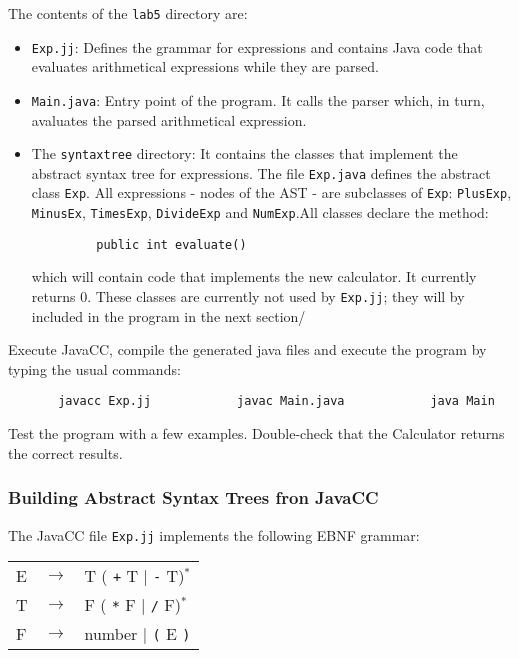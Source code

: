 \documentclass{article}
\begin{document}
The contents of the {\tt lab5} directory are:
\begin{itemize}
\item {\tt Exp.jj}: Defines the grammar for expressions and contains Java code that evaluates arithmetical expressions while they are parsed.
\item {\tt Main.java}: Entry point of the program. It calls the parser which, in turn, avaluates the parsed arithmetical expression.
\item The {\tt syntaxtree} directory: It contains the classes that implement the abstract syntax tree for expressions. The file {\tt Exp.java} defines the abstract class {\tt Exp}. All expressions - nodes of the AST - are subclasses of {\tt Exp}: {\tt PlusExp}, {\tt MinusEx}, {\tt TimesExp}, {\tt DivideExp} and {\tt NumExp}.All classes declare the method:
\begin{verbatim}
         public int evaluate()
\end{verbatim}
which will contain code that implements the new calculator. It currently returns 0. These classes are currently not used by \verb+Exp.jj+; they will by included in the program in the next section/

\end{itemize}

Execute JavaCC, compile the generated java files and execute the program by typing the usual commands:

\begin{verbatim}
       javacc Exp.jj            javac Main.java            java Main
\end{verbatim}

\noindent Test the program with a few examples. Double-check that the Calculator returns the correct results.

\subsubsection*{Building Abstract Syntax Trees fron JavaCC}

The JavaCC file {\tt Exp.jj} implements the following EBNF grammar:

\begin{tabular}{lcl}
E & $\rightarrow$ & T ( \verb-+- T $|$ \verb+-+ T)$^*$ \\
T & $\rightarrow$ & F ( \verb+*+ F $|$ \verb+/+ F)$^*$ \\
F & $\rightarrow$ & number $|$ \verb+(+ E \verb+)+\\
\end{tabular}
\end{document}
